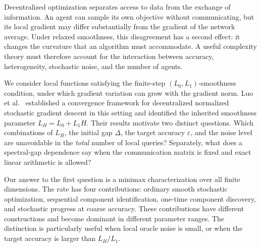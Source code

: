 \documentclass[11pt,a4paper]{article}
\newcommand{\eps}{\varepsilon}
\theoremstyle{remark}
\begin{document}
Decentralized optimization separates access to data from the exchange of
information. An agent can sample its own objective without communicating,
but its local gradient may differ substantially from the gradient of the
network average. Under relaxed smoothness, this disagreement has a second
effect: it changes the curvature that an algorithm must accommodate.
A useful complexity theory must therefore account for the interaction
between accuracy, heterogeneity, stochastic noise, and the number of agents.

We consider local functions satisfying the finite-step
$(L_0,L_1)$-smoothness condition, under which gradient variation can grow
with the gradient norm. Luo et al.~\cite{relaxed2025} established a
convergence framework for decentralized normalized stochastic gradient
descent in this setting and identified the inherited smoothness parameter
$L_H=L_0+L_1H$. Their results motivate two distinct questions. Which
combinations of $L_H$, the initial gap $\Delta$, the target accuracy $\eps$,
and the noise level are unavoidable in the \emph{total} number of local
queries? Separately, what does a spectral-gap dependence say when the
communication matrix is fixed and exact linear arithmetic is allowed?

Our answer to the first question is a minimax characterization over all
finite dimensions. The rate has four contributions: ordinary smooth
stochastic optimization, sequential component identification, one-time
component discovery, and stochastic progress at coarse accuracy. These
contributions have different constructions and become dominant in different
parameter ranges. The distinction is particularly useful when local oracle
noise is small, or when the target accuracy is larger than $L_H/L_1$.
\end{document}
